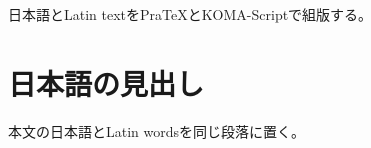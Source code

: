 \documentclass{scrartcl}
\begin{document}
日本語とLatin textをPraTeXとKOMA-Scriptで組版する。
\section{日本語の見出し}
本文の日本語とLatin wordsを同じ段落に置く。
\end{document}

